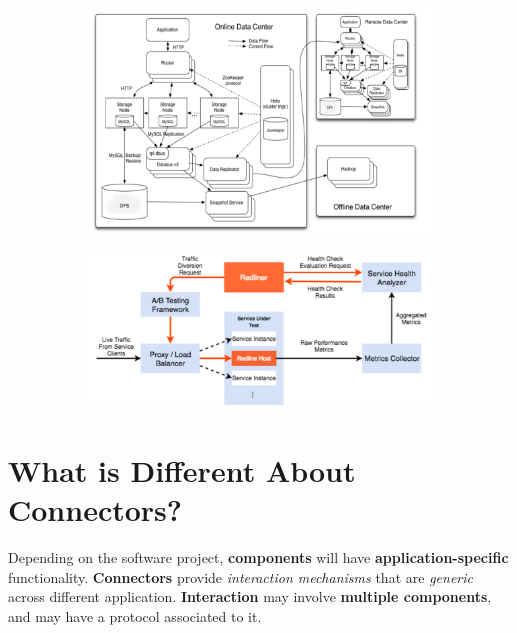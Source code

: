 \documentclass[a4paper]{report}
\begin{document}
\begin{figure}[H]
\centering
\hskip-2.5cm\begin{subfigure}{1\textwidth}
  \includegraphics[width=1\linewidth]
  {images/10-linked.png}
\end{subfigure}
\end{figure}

\begin{figure}[H]
\centering
\hskip-2.5cm\begin{subfigure}{1\textwidth}
  \includegraphics[width=1\linewidth]
  {images/10-linked-redliner.png}
\end{subfigure}
\end{figure}

\section{What is Different About Connectors?}
Depending on the software project, \textbf{components} will have \textbf{application-specific} functionality. \textbf{Connectors} provide \textit{interaction mechanisms} that are \textit{generic} across different application. \textbf{Interaction} may involve \textbf{multiple components}, and may have a protocol associated to it.\\
\end{document}
